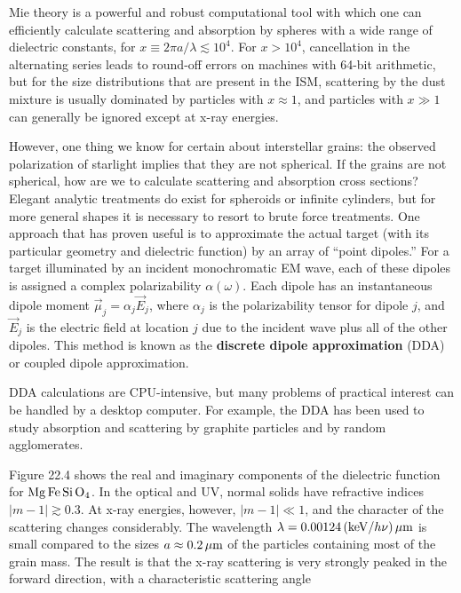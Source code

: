 \documentclass[a4paper,10pt]{article}
\begin{document}
{\noindent}Mie theory is a powerful and robust computational tool with which one can efficiently calculate scattering and absorption by spheres with a wide range of dielectric constants, for $x\equiv2\pi a/\lambda\lesssim10^4$. For $x>10^4$, cancellation in the alternating series leads to round-off errors on machines with 64-bit arithmetic, but for the size distributions that are present in the ISM, scattering by the dust mixture is usually dominated by particles with $x\approx1$, and particles with $x\gg1$ can generally be ignored except at x-ray energies.

{\noindent}However, one thing we know for certain about interstellar grains: the observed polarization of starlight implies that they are not spherical. If the grains are not spherical, how are we to calculate scattering and absorption cross sections? Elegant analytic treatments do exist for spheroids or infinite cylinders, but for more general shapes it is necessary to resort to brute force treatments. One approach that has proven useful is to approximate the actual target (with its particular geometry and dielectric function) by an array of ``point dipoles.'' For a target illuminated by an incident monochromatic EM wave, each of these dipoles is assigned a complex polarizability $\alpha(\omega)$. Each dipole has an instantaneous dipole moment $\vec{\mu}_j=\alpha_j\vec{E}_j$, where $\alpha_j$ is the polarizability tensor for dipole $j$, and $\vec{E}_j$ is the electric field at location $j$ due to the incident wave plus all of the other dipoles. This method is known as the \textbf{discrete dipole approximation} (DDA) or coupled dipole approximation.

{\noindent}DDA calculations are CPU-intensive, but many problems of practical interest can be handled by a desktop computer. For example, the DDA has been used to study absorption and scattering by graphite particles and by random agglomerates.

{\noindent}Figure 22.4 shows the real and imaginary components of the dielectric function for ${\rm Mg\,Fe\,Si\,O_4}$. In the optical and UV, normal solids have refractive indices $|m-1|\gtrsim0.3$. At x-ray energies, however, $|m-1|\ll1$, and the character of the scattering changes considerably. The wavelength $\lambda=0.00124\,({\rm keV}/h\nu)\,\mu{\rm m}$ is small compared to the sizes $a\approx0.2\,\mu{\rm m}$ of the particles containing most of the grain mass. The result is that the x-ray scattering is very strongly peaked in the forward direction, with a characteristic scattering angle
\end{document}
